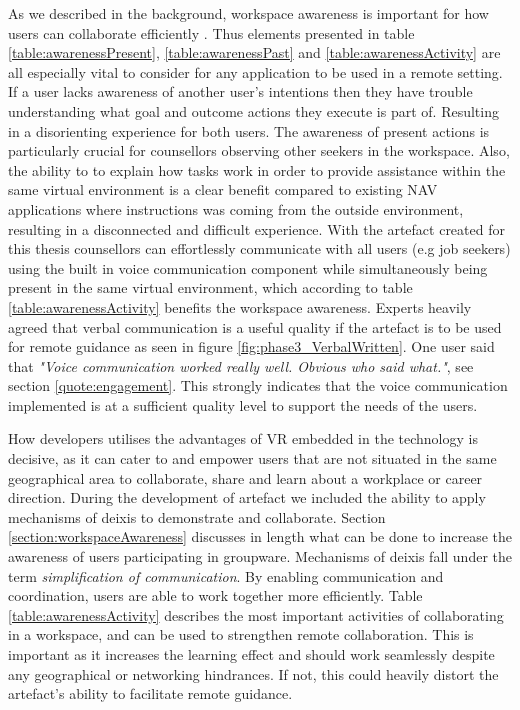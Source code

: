 As we described in the background, workspace awareness is important for how users can collaborate efficiently \cite{gutwin1996workspace}. Thus elements presented in table \ref{table:awarenessPresent}, \ref{table:awarenessPast}  and \ref{table:awarenessActivity} are all especially vital to consider for any application to be used in a remote setting. If a user lacks awareness of another user's intentions then they have trouble understanding what goal and outcome actions they execute is part of. Resulting in a disorienting experience for both users. The awareness of present actions is particularly crucial for counsellors observing other seekers in the workspace. Also, the ability to to explain how tasks work in order to provide assistance within the same virtual environment is a clear benefit compared to existing NAV applications where instructions was coming from the outside environment, resulting in a disconnected and difficult experience. With the artefact created for this thesis counsellors can effortlessly communicate with all users (e.g job seekers) using the built in voice communication component while simultaneously being present in the same virtual environment, which according to table \ref{table:awarenessActivity} benefits the workspace awareness. Experts heavily agreed that verbal communication is a useful quality if the artefact is to be used for remote guidance as seen in figure \ref{fig:phase3_VerbalWritten}. One user said that \textit{"Voice communication worked really well. Obvious who said what."}, see section \ref{quote:engagement}. This strongly indicates that the voice communication implemented is at a sufficient quality level to support the needs of the users.






How developers utilises the advantages of VR embedded in the technology is decisive, as it can cater to and empower users that are not situated in the same geographical area to collaborate, share and learn about a workplace or career direction. During the development of artefact we included the ability to apply mechanisms of deixis to demonstrate and collaborate. Section \ref{section:workspaceAwareness} discusses in length what can be done to increase the awareness of users participating in groupware. Mechanisms of deixis fall under the term \textit{simplification of communication}. By enabling communication and coordination, users are able to work together more efficiently. Table \ref{table:awarenessActivity} describes the most important activities of collaborating in a workspace, and can be used to strengthen remote collaboration. This is important as it increases the learning effect \cite{stahl2006computer} and should work seamlessly despite any geographical or networking hindrances. If not, this could heavily distort the artefact's ability to facilitate remote guidance.


